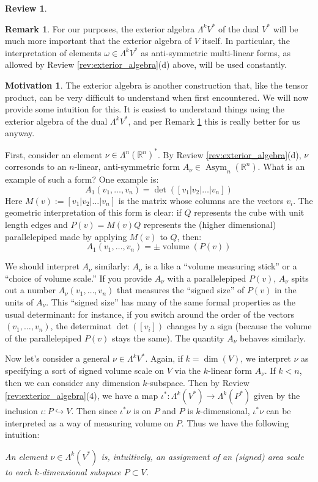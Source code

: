 \documentclass[12pt]{article}
\theoremstyle{definition}
\newtheorem{review}[theorem]{Review}
\newtheorem{remark}[theorem]{Remark}
\newtheorem{motivation}[theorem]{Motivation}
\numberwithin{equation}{section}
\newcommand{\R}{{\mathbb R}}
\newcommand{\op}{\operatorname}
\begin{document}
\begin{review}
\begin{remark} \label{rmk:dual_exterior_algebra} For our purposes, the exterior algebra $\Lambda^k V^*$ of the dual $V^*$ will be much more important that the exterior algebra of $V$ itself. In particular, the interpretation of elements $\omega \in \Lambda^k V^*$ as anti-symmetric multi-linear forms, as allowed by Review \ref{rev:exterior_algebra}(d) above, will be used constantly. 
\end{remark}

\begin{motivation} \label{mot:exterior_algebra} The exterior algebra is another construction that, like the tensor product, can be very difficult to understand when first encountered. We will now provide some intuition for this. It is easiest to understand things using the exterior algebra of the dual $\Lambda^k V^*$, and per Remark \ref{rmk:dual_exterior_algebra} this is really better for us anyway.

First, consider an element $\nu \in \Lambda^n (\R^n)^*$. By Review \ref{rev:exterior_algebra}(d), $\nu$ corresonds to an $n$-linear, anti-symmetric form $A_\nu \in \op{Asym}_n(\R^n)$. What is an example of such a form? One example is:
\[
A_1(v_1,\dots,v_n) = \op{det}([v_1|v_2|\dots|v_n])
\]
Here $M(v) := [v_1|v_2|\dots|v_n]$ is the matrix whose columns are the vectors $v_i$. The geometric interpretation of this form is clear: if $Q$ represents the cube with unit length edges and $P(v) = M(v)Q$ represents the (higher dimensional) parallelepiped made by applying $M(v)$ to $Q$, then:
\[
A_1(v_1,\dots,v_n) = \pm \op{volume}(P(v))
\]

We should interpret $A_\nu$ similarly: $A_\nu$ is a like a ``volume measuring stick'' or a ``choice of volume scale.'' If you provide $A_\nu$ with a parallelepiped $P(v)$, $A_\nu$ spits out a number $A_\nu(v_1,\dots,v_n)$ that measures the ``signed size'' of $P(v)$ in the units of $A_\nu$. This ``signed size'' has many of the same formal properties as the usual determinant: for instance, if you switch around the order of the vectors $(v_1,\dots,v_n)$, the determinat $\op{det}([v_i])$ changes by a sign (because the volume of the parallelepiped $P(v)$ stays the same). The quantity $A_\nu$ behaves similarly.

Now let's consider a general $\nu \in \Lambda^k V^*$. Again, if $k = \op{dim}(V)$, we interpret $\nu$ as specifying a sort of signed volume scale on $V$ via the $k$-linear form $A_\nu$. If $k < n$, then we can consider any dimension $k$-subspace. Then by Review \ref{rev:exterior_algebra}(4), we have a map $\iota^*:\Lambda^k(V^*) \to \Lambda^k(P^*)$ given by the inclusion $\iota:P \hookrightarrow V$. Then since $\iota^*\nu$ is on $P$ and $P$ is $k$-dimensional, $\iota^*\nu$ can be interpreted as a way of measuring volume on $P$. Thus we have the following intuition:
\begin{center}
\emph{An element $\nu \in \Lambda^k(V^*)$ is, intuitively, an assignment of an (signed) area scale to each $k$-dimensional subspace $P \subset V$.} 
\end{center}
\end{motivation}


\end{review}
\end{document}
